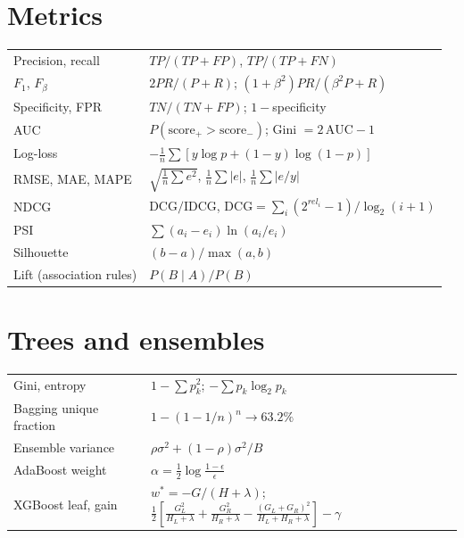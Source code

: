 \section*{Metrics}
\begin{tabular}{@{}p{}p{}@{}}
\toprule
Precision, recall & $TP/(TP+FP)$,\; $TP/(TP+FN)$\\
$F_1$, $F_\beta$ & $2PR/(P+R)$;\; $(1+\beta^2)PR/(\beta^2P+R)$\\
Specificity, FPR & $TN/(TN+FP)$;\; $1-$specificity\\
AUC & $P(\text{score}_+>\text{score}_-)$;\; Gini $=2\,\text{AUC}-1$\\
Log-loss & $-\frac1n\sum[y\log p+(1-y)\log(1-p)]$\\
RMSE, MAE, MAPE & $\sqrt{\frac1n\sum e^2}$,\; $\frac1n\sum|e|$,\; $\frac1n\sum|e/y|$\\
NDCG & $\text{DCG}/\text{IDCG}$, $\text{DCG}=\sum_i(2^{rel_i}-1)/\log_2(i+1)$\\
PSI & $\sum(a_i-e_i)\ln(a_i/e_i)$\\
Silhouette & $(b-a)/\max(a,b)$\\
Lift (association rules) & $P(B\mid A)/P(B)$\\
\bottomrule
\end{tabular}

\section*{Trees and ensembles}
\begin{tabular}{@{}p{}p{}@{}}
\toprule
Gini, entropy & $1-\sum p_k^2$;\; $-\sum p_k\log_2p_k$\\
Bagging unique fraction & $1-(1-1/n)^n\to63.2\%$\\
Ensemble variance & $\rho\sigma^2+(1-\rho)\sigma^2/B$\\
AdaBoost weight & $\alpha=\frac12\log\frac{1-\epsilon}{\epsilon}$\\
XGBoost leaf, gain & $w^*=-G/(H+\lambda)$;\; $\frac12[\frac{G_L^2}{H_L+\lambda}+\frac{G_R^2}{H_R+\lambda}-\frac{(G_L+G_R)^2}{H_L+H_R+\lambda}]-\gamma$\\
\bottomrule
\end{tabular}

